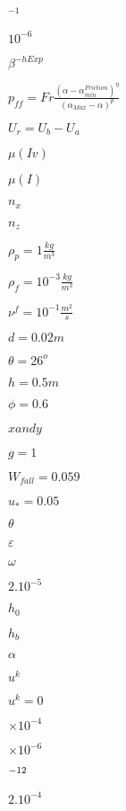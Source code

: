 \documentclass{article}
\begin{document}
$^{-1}$
\pagebreak

$ 10^{-6} $
\pagebreak

$ \beta^{-hExp}$
\pagebreak

$ p_{ff} = Fr \frac{\left( \alpha - \alpha_{min}^{Friction} \right)^{\eta}}{\left(\alpha_{Max} - \alpha \right)^p} $
\pagebreak

$ U_r=U_b-U_a $
\pagebreak

$\mu(Iv)$
\pagebreak

$\mu(I)$
\pagebreak

$ n_{x}$
\pagebreak

$ n_{z}$
\pagebreak

$\rho_p=1 \frac{kg}{m^3}$
\pagebreak

$\rho_f=10^{-3} \frac{kg}{m^3}$
\pagebreak

$\nu^f=10^{-1} \frac{m^2}{s}$
\pagebreak

$d=0.02 m$
\pagebreak

$\theta=26^o $
\pagebreak

$h=0.5 m$
\pagebreak

$\phi=0.6$
\pagebreak

$x and y$
\pagebreak

$g=1$
\pagebreak

$W_{fall}=0.059$
\pagebreak

$u_*=0.05$
\pagebreak

$\theta$
\pagebreak

$\varepsilon$
\pagebreak

$\omega$
\pagebreak

$ 2.10^{-5}$
\pagebreak

$h_0$
\pagebreak

$h_b$
\pagebreak

$\alpha$
\pagebreak

$u^k$
\pagebreak

$u^k=0$
\pagebreak

$\times 10^{-4}$
\pagebreak

$\times 10^{-6}$
\pagebreak

$\time 10^{-12}$
\pagebreak

$ 2.10^{-4}$
\pagebreak
\end{document}
